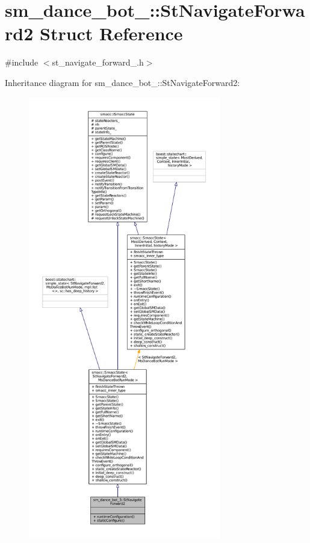 \hypertarget{structsm__dance__bot__3_1_1StNavigateForward2}{}\section{sm\+\_\+dance\+\_\+bot\+\_\+:\+:St\+Navigate\+Forward2 Struct Reference}
\label{structsm__dance__bot__3_1_1StNavigateForward2}


{\ttfamily \#include $<$st\+\_\+navigate\+\_\+forward\+\_.\+h$>$}



Inheritance diagram for sm\+\_\+dance\+\_\+bot\+\_\+:\+:St\+Navigate\+Forward2\+:
\nopagebreak
\begin{figure}[H]
\begin{center}
\leavevmode
\includegraphics[height=550pt]{structsm__dance__bot__3_1_1StNavigateForward2__inherit__graph}
\end{center}
\end{figure}



